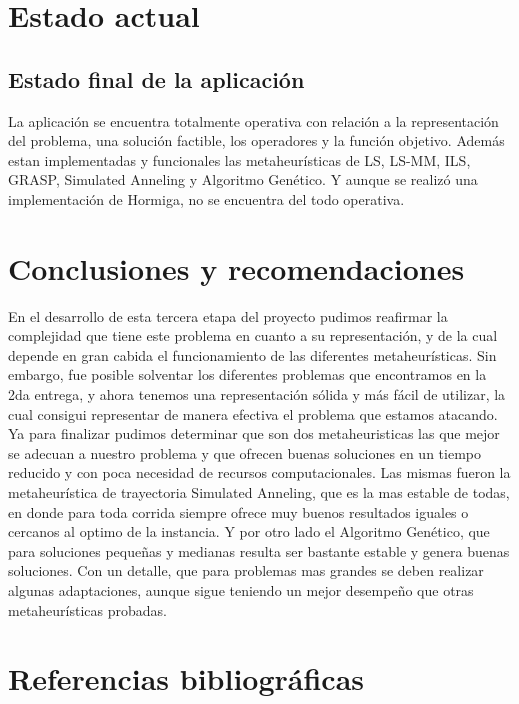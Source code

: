 \documentclass[letterpaper,11pt]{article}
\begin{document}
\section{Estado actual}

\subsection{Estado final de la aplicaci\'on}

La aplicaci\'on se encuentra totalmente operativa con relaci\'on a la representaci\'on del problema, una soluci\'on
factible, los operadores y la funci\'on objetivo. Adem\'as estan implementadas y funcionales las metaheur\'isticas de LS, LS-MM, ILS, GRASP, Simulated Anneling y Algoritmo Gen\'etico. Y aunque se realiz\'o una implementaci\'on de  Hormiga, no se encuentra del todo operativa.	

\newpage

\section{Conclusiones y recomendaciones}

En el desarrollo de esta tercera etapa del proyecto pudimos reafirmar la complejidad que tiene este problema
en cuanto a su representaci\'on, y de la cual depende en gran cabida el funcionamiento de las diferentes 
metaheur\'isticas. Sin embargo, fue posible solventar los diferentes problemas que encontramos en la 2da entrega,
y ahora tenemos una representaci\'on s\'olida y m\'as f\'acil de utilizar, la cual consigui representar de manera efectiva el problema que estamos atacando.\\

Ya para finalizar pudimos determinar que son dos metaheuristicas las que mejor se adecuan a nuestro problema y que ofrecen buenas soluciones en un tiempo reducido y con poca necesidad de recursos computacionales. Las mismas fueron la metaheur\'istica de trayectoria Simulated Anneling, que es la mas estable de todas, en donde para toda corrida siempre ofrece muy buenos resultados iguales o cercanos al optimo de la instancia. Y por otro lado el Algoritmo Gen\'etico, que para soluciones peque\~nas y medianas resulta ser bastante estable y genera buenas soluciones. Con un detalle, que para problemas mas grandes se deben realizar algunas adaptaciones, aunque sigue teniendo un mejor desempe\~no que otras metaheur\'isticas probadas.

\newpage

\section{Referencias bibliogr\'aficas}
\end{document}
